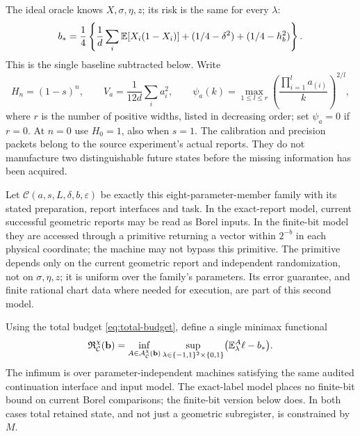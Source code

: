 The ideal oracle knows $X,\sigma,\eta,z$; its risk is the same for every $\lambda$:
\begin{equation}\label{eq:robust-baseline}
 b_* =\frac14\left\{\frac1d\sum_i\mathbb E[X_i(1-X_i)]
           +(1/4-\delta^2)+(1/4-h_b^2)\right\}.
\end{equation}
This is the single baseline subtracted below. Write
\[
 H_n=(1-s)^n,\qquad V_a=\frac1{12d}\sum_i a_i^2,
 \qquad \psi_a(k)=\max_{1\le l\le r}
       \left(\frac{\prod_{i=1}^l a_{(i)}}{k}\right)^{2/l},
\]
where $r$ is the number of positive widths, listed in decreasing order; set $\psi_a=0$ if $r=0$. At $n=0$ use $H_0=1$, also when $s=1$. The calibration and precision packets belong to the source experiment's actual reports. They do not manufacture two distinguishable future states before the missing information has been acquired.

Let $\mathcal C(a,s,L,\delta,b,\varepsilon)$ be exactly this eight-parameter-member family with its stated preparation, report interfaces and task. In the exact-report model, current successful geometric reports may be read as Borel inputs. In the finite-bit model they are accessed through a primitive returning a vector within $2^{-b}$ in each physical coordinate; the machine may not bypass this primitive. The primitive depends only on the current geometric report and independent randomization, not on $\sigma,\eta,z$; it is uniform over the family's parameters. Its error guarantee, and finite rational chart data where needed for execution, are part of this second model.

Using the total budget \eqref{eq:total-budget}, define a single minimax functional
\begin{equation}\label{eq:robust-risk}
 \mathfrak R_{\mathcal C}^{\chi}(\mathbf b)
   =\inf_{A\in\mathcal A_{\mathcal C}^{\chi}(\mathbf b)}
       \sup_{\lambda\in\{-1,1\}^2\times\{0,1\}}
          \bigl(\mathbb E_\lambda^A\ell-b_*\bigr).
\end{equation}
The infimum is over parameter-independent machines satisfying the same audited continuation interface and input model. The exact-label model places no finite-bit bound on current Borel comparisons; the finite-bit version below does. In both cases total retained state, and not just a geometric subregister, is constrained by $M$.

